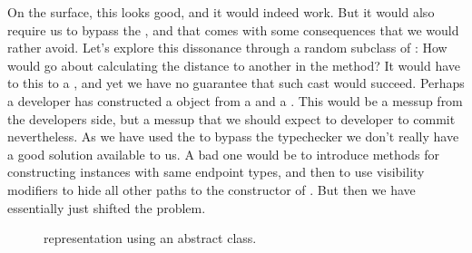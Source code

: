 On the surface, this looks good, and it would indeed work. But it would also require us to bypass the , and that comes with some consequences that we would rather avoid. Let's explore this dissonance through a random subclass of : How would  go about calculating the distance to another  in the  method? It would have to  this to a , and yet we have no guarantee that such cast would succeed. Perhaps a developer has constructed a  object from a  and a . This would be a messup from the developers side, but a messup that we should expect to developer to commit nevertheless. As we have used the  to bypass the typechecker we don't really have a good solution available to us. A bad one would be to introduce  methods for constructing  instances with same endpoint types, and then to use visibility modifiers to hide all other paths to the constructor of . But then we have essentially just shifted the problem.

\begin{figure}[tbp]
  
  \caption{ representation using an abstract class.}
  \label{fig:generics:linesegment:aclass}
\end{figure}

